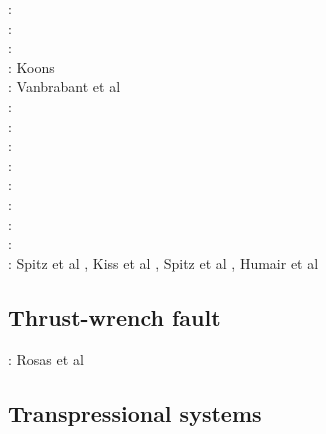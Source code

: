 \begin{scriptsize}
\nineteeneightythree: \cite{stoc83}\cite{dasd83}\\
\nineteeneightyfour: \cite{dahl84}\cite{dasd84}\\
\nineteenninety: \cite{dahl90}\\
\nineteenninetyfour: Koons \cite{koon94}\\
\nineteenninetynine: Vanbrabant et al \cite{vajh99}\\
\twothousandthree: \cite{wiep03}\cite{smbs03}\cite{muso03}\cite{vamf03}\\
\twothousandsix: \cite{simp06}\cite{yabm06}\\
\twothousandtwelve: \cite{rukb12}\\
\twothousandthirteen: \cite{rugb13}\\
\twothousandsixteen: \cite{mauw16}\\
\twothousandseventeen: \cite{mauw17}\cite{rugb17}\\
\twothousandeighteen: \cite{weib18}\\
\twothousandnineteen: \cite{elgb19}\cite{meho19}\cite{meho19b}\\
\twothousandtwenty: Spitz et al \cite{spsk20}, Kiss et al \cite{kids20}, Spitz et al \cite{spbe20}, Humair et al \cite{hube20}
\end{scriptsize}

\subsection{Thrust-wrench fault} 

\begin{scriptsize}
\twothousandfifteen: Rosas et al \cite{rods15}
\end{scriptsize}

\subsection{Transpressional systems} 

